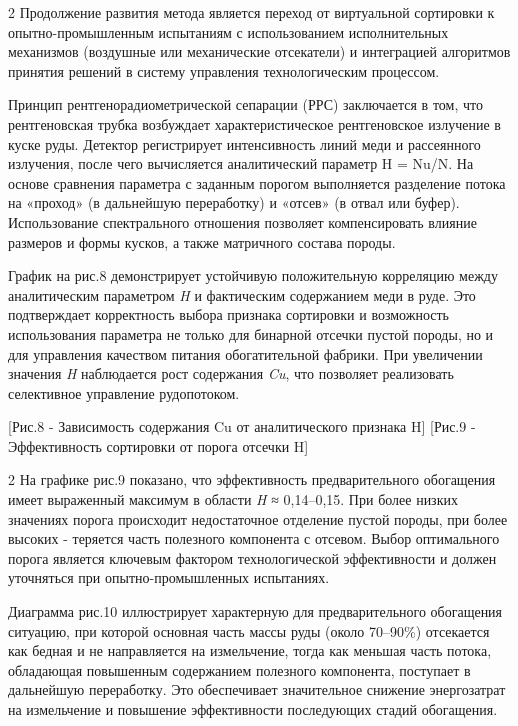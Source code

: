 \begin{multicols}{2}
Продолжение развития метода является переход от виртуальной сортировки к
опытно-промышленным испытаниям с использованием исполнительных
механизмов (воздушные или механические отсекатели) и интеграцией
алгоритмов принятия решений в систему управления технологическим
процессом.

Принцип рентгенорадиометрической сепарации (РРС) заключается в том, что
рентгеновская трубка возбуждает характеристическое рентгеновское
излучение в куске руды. Детектор регистрирует интенсивность линий меди и
рассеянного излучения, после чего вычисляется аналитический параметр H =
Nu/N. На основе сравнения параметра с
заданным порогом выполняется разделение потока на «проход» (в дальнейшую
переработку) и «отсев» (в отвал или буфер). Использование спектрального
отношения позволяет компенсировать влияние размеров и формы кусков, а
также матричного состава породы.

График на рис.8 демонстрирует устойчивую положительную корреляцию между
аналитическим параметром \emph{H} и фактическим содержанием меди в руде.
Это подтверждает корректность выбора признака сортировки и возможность
использования параметра не только для бинарной отсечки пустой породы, но
и для управления качеством питания обогатительной фабрики. При
увеличении значения \emph{H} наблюдается рост содержания \emph{Cu}, что
позволяет реализовать селективное управление рудопотоком.
\end{multicols}

\begin{figs}
    [Рис.8 - Зависимость содержания Cu от аналитического признака H]
    [Рис.9 - Эффективность сортировки от порога отсечки H]
\end{figs}

\begin{multicols}{2}
На графике рис.9 показано, что эффективность предварительного обогащения
имеет выраженный максимум в области \emph{H} ≈ 0,14--0,15. При более
низких значениях порога происходит недостаточное отделение пустой
породы, при более высоких - теряется часть полезного компонента с
отсевом. Выбор оптимального порога является ключевым фактором
технологической эффективности и должен уточняться при
опытно-промышленных испытаниях.

Диаграмма рис.10 иллюстрирует характерную для предварительного
обогащения ситуацию, при которой основная часть массы руды (около
70--90\%) отсекается как бедная и не направляется на измельчение, тогда
как меньшая часть потока, обладающая повышенным содержанием полезного
компонента, поступает в дальнейшую переработку. Это обеспечивает
значительное снижение энергозатрат на измельчение и повышение
эффективности последующих стадий обогащения.
\end{multicols}

